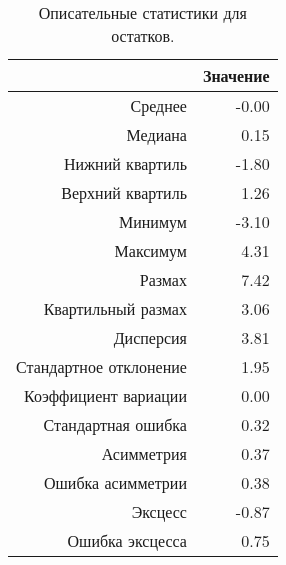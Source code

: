 \begin{table}[ht]
\centering
\begin{tabular}{rr}
  \hline
 & Значение \\ 
  \hline
Среднее & -0.00 \\ 
  Медиана & 0.15 \\ 
  Нижний квартиль & -1.80 \\ 
  Верхний квартиль & 1.26 \\ 
  Минимум & -3.10 \\ 
  Максимум & 4.31 \\ 
  Размах & 7.42 \\ 
  Квартильный размах & 3.06 \\ 
  Дисперсия & 3.81 \\ 
  Стандартное отклонение & 1.95 \\ 
  Коэффициент вариации & 0.00 \\ 
  Стандартная ошибка & 0.32 \\ 
  Асимметрия & 0.37 \\ 
  Ошибка асимметрии & 0.38 \\ 
  Эксцесс & -0.87 \\ 
  Ошибка эксцесса & 0.75 \\ 
   \hline
\end{tabular}
\caption{Описательные статистики для остатков.} 
\label{table:resid_dstats}
\end{table}
